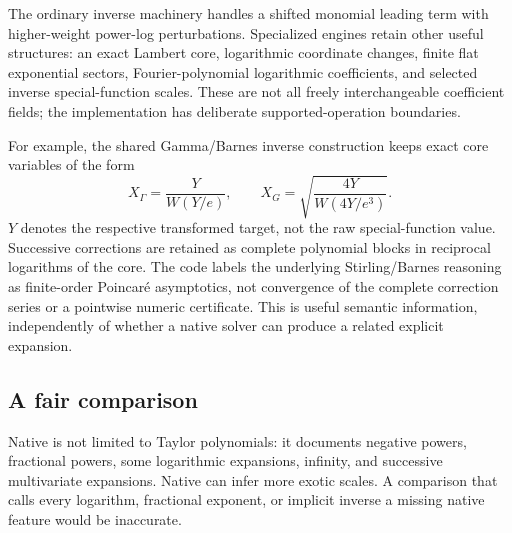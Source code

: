 \documentclass[11pt,a4paper]{article}
\newcommand{\code}[1]{\texttt{\detokenize{#1}}}
\begin{document}
The ordinary inverse machinery handles a shifted monomial leading term with higher-weight power-log perturbations. Specialized engines retain other useful structures: an exact Lambert core, logarithmic coordinate changes, finite flat exponential sectors, Fourier-polynomial logarithmic coefficients, and selected inverse special-function scales. These are not all freely interchangeable coefficient fields; the implementation has deliberate supported-operation boundaries.\cite{core,source-coordinates,flat,fourier,gamma,reciprocal}

For example, the shared Gamma/Barnes inverse construction keeps exact core variables of the form
\begin{equation}
 X_\Gamma=\frac{Y}{W(Y/e)},\qquad
 X_G=\sqrt{\frac{4Y}{W(4Y/e^3)}}.
\end{equation}
$Y$ denotes the respective transformed target, not the raw special-function value. Successive corrections are retained as complete polynomial blocks in reciprocal logarithms of the core. The code labels the underlying Stirling/Barnes reasoning as finite-order Poincar\'e asymptotics, not convergence of the complete correction series or a pointwise numeric certificate. This is useful semantic information, independently of whether a native solver can produce a related explicit expansion.\cite{gamma,gamma-checks}

\subsection{A fair comparison}

Native \code{Series} is not limited to Taylor polynomials: it documents negative powers, fractional powers, some logarithmic expansions, infinity, and successive multivariate expansions. Native \code{Asymptotic} can infer more exotic scales. A comparison that calls every logarithm, fractional exponent, or implicit inverse a missing native feature would be inaccurate.\cite{wl-series,wl-asymptotic}
\end{document}
